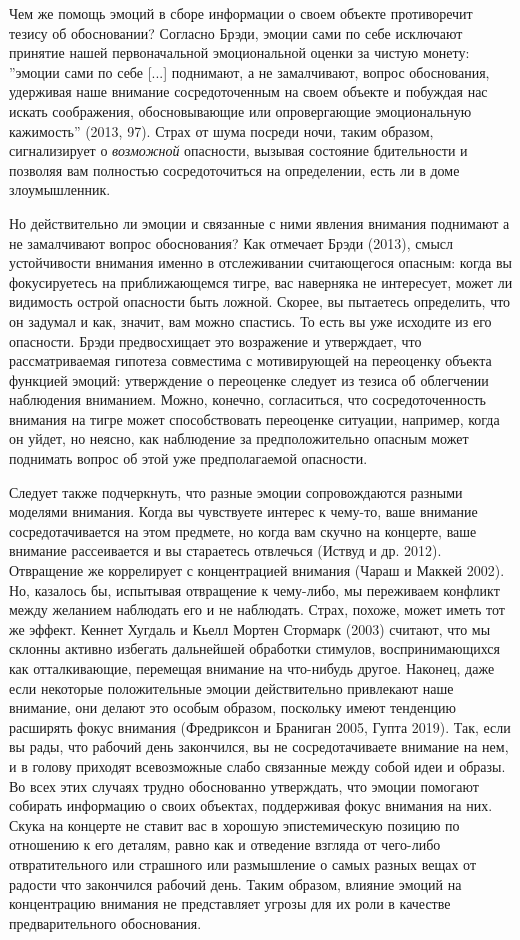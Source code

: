 \documentclass[11pt]{book}
\begin{document}
Чем же помощь эмоций в сборе информации о своем объекте противоречит тезису об обосновании? Согласно Брэди, эмоции сами по себе исключают принятие нашей первоначальной эмоциональной оценки за чистую монету: ''эмоции сами по себе [...] поднимают, а не замалчивают, вопрос обоснования, удерживая наше внимание сосредоточенным на своем объекте и побуждая нас искать соображения, обосновывающие или опровергающие эмоциональную кажимость'' (2013, 97). Страх от шума посреди ночи, таким образом, сигнализирует о \textit{возможной} опасности, вызывая состояние бдительности и позволяя вам полностью сосредоточиться на определении, есть ли в доме злоумышленник.

Но действительно ли эмоции и связанные с ними явления внимания поднимают а не замалчивают вопрос обоснования? Как отмечает Брэди (2013), смысл устойчивости внимания именно в отслеживании считающегося опасным: когда вы фокусируетесь на приближающемся тигре, вас наверняка не интересует, может ли видимость острой опасности быть ложной. Скорее, вы пытаетесь определить, что он задумал и как, значит, вам можно спастись. То есть вы уже исходите из его опасности. Брэди предвосхищает это возражение и утверждает, что рассматриваемая гипотеза совместима с мотивирующей на переоценку объекта функцией эмоций: утверждение о переоценке следует из тезиса об облегчении наблюдения вниманием. Можно, конечно, согласиться, что сосредоточенность внимания на тигре может способствовать переоценке ситуации, например, когда он уйдет, но неясно, как наблюдение за предположительно опасным может поднимать вопрос об этой уже предполагаемой опасности.

Следует также подчеркнуть, что разные эмоции сопровождаются разными моделями внимания. Когда вы чувствуете интерес к чему-то, ваше внимание сосредотачивается на этом предмете, но когда вам скучно на концерте, ваше внимание рассеивается и вы стараетесь отвлечься (Иствуд и др. 2012). Отвращение же коррелирует с концентрацией внимания (Чараш и Маккей 2002). Но, казалось бы, испытывая отвращение к чему-либо, мы переживаем конфликт между желанием наблюдать его и не наблюдать. Страх, похоже, может иметь тот же эффект. Кеннет Хугдаль и Кьелл Мортен Стормарк (2003) считают, что мы склонны активно избегать дальнейшей обработки стимулов, воспринимающихся как отталкивающие, перемещая внимание на что-нибудь другое. Наконец, даже если некоторые положительные эмоции действительно привлекают наше внимание, они делают это особым образом, поскольку имеют тенденцию расширять фокус внимания (Фредриксон и Браниган 2005, Гупта 2019). Так, если вы рады, что рабочий день закончился, вы не сосредотачиваете внимание на нем, и в голову приходят всевозможные слабо связанные между собой идеи и образы. Во всех этих случаях трудно обоснованно утверждать, что эмоции помогают собирать информацию о своих объектах, поддерживая фокус внимания на них. Скука на концерте не ставит вас в хорошую эпистемическую позицию по отношению к его деталям, равно как и отведение взгляда от чего-либо отвратительного или страшного или размышление о самых разных вещах от радости что закончился рабочий день. Таким образом, влияние эмоций на концентрацию внимания не представляет угрозы для их роли в качестве предварительного обоснования.
\end{document}
